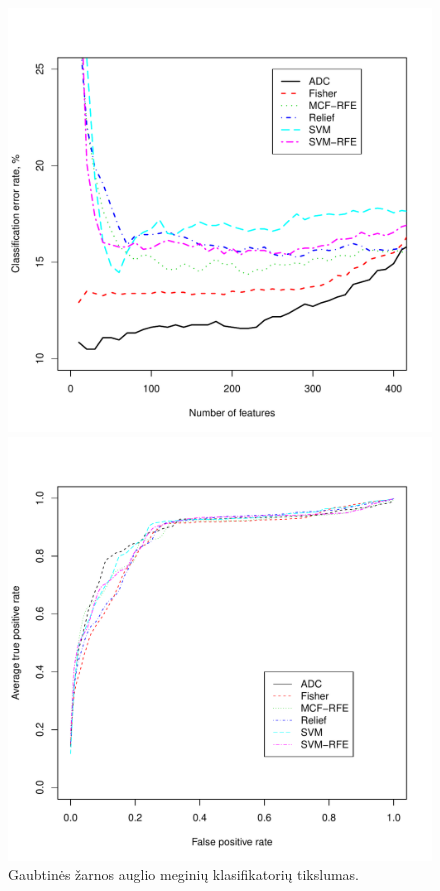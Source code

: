 \begin{figure}[H]
\begin{minipage}[b]{0.5\linewidth}
\centering
\includegraphics[width=.9\textwidth]{../bachelor/images/nncolon_classification.pdf}
\caption{Gaubtinės žarnos auglio meginių klasifikatorių tikslumas.}
\label{fig:class_colon}
\end{minipage}
\hspace{0.2cm}
\begin{minipage}[b]{0.5\linewidth}
\centering
\includegraphics[width=.85\textwidth]{../bachelor/images/nncolon_roc.pdf}

\end{minipage}
\end{figure}
